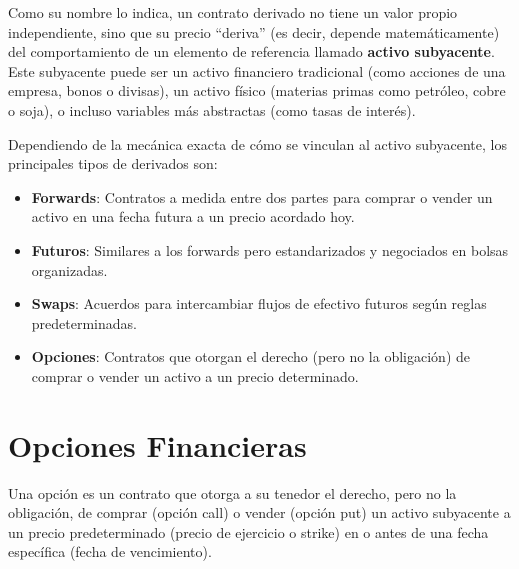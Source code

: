 Como su nombre lo indica, un contrato derivado no tiene un valor propio independiente, sino que su precio ``deriva'' (es decir, depende matemáticamente) del comportamiento de un elemento de referencia llamado \textbf{activo subyacente}. Este subyacente puede ser un activo financiero tradicional (como acciones de una empresa, bonos o divisas), un activo físico (materias primas como petróleo, cobre o soja), o incluso variables más abstractas (como tasas de interés).

Dependiendo de la mecánica exacta de cómo se vinculan al activo subyacente, los principales tipos de derivados son:

\begin{itemize}
    \item \textbf{Forwards}: Contratos a medida entre dos partes para comprar o vender un activo en una fecha futura a un precio acordado hoy.
    
    \item \textbf{Futuros}: Similares a los forwards pero estandarizados y negociados en bolsas organizadas.
    
    \item \textbf{Swaps}: Acuerdos para intercambiar flujos de efectivo futuros según reglas predeterminadas.
    
    \item \textbf{Opciones}: Contratos que otorgan el derecho (pero no la obligación) de comprar o vender un activo a un precio determinado.
\end{itemize}

\section{Opciones Financieras}

Una opción es un contrato que otorga a su tenedor el derecho, pero no la obligación, de comprar (opción call) o vender (opción put) un activo subyacente a un precio predeterminado (precio de ejercicio o strike) en o antes de una fecha específica (fecha de vencimiento).

